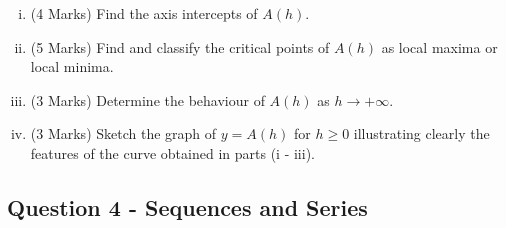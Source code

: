 ﻿ \documentclass[a4paper,12pt]{article}
\begin{document}
	\bigskip
\begin{enumerate}[(i)]
\item (4 Marks) Find the axis intercepts of $A(h)$.
	
	\bigskip
\item (5 Marks) Find and classify the critical points of $A(h)$ as local maxima or
local minima.
	
	\bigskip
\item (3 Marks) Determine the behaviour of $A(h)$ as $h \rightarrow + \infty$.
	
	\bigskip
	\item (3 Marks) Sketch the graph of $y = A(h)$ for $h \geq 0$ illustrating clearly
the features of the curve obtained in parts (i - iii).
	
	

\end{enumerate}


\newpage
\subsection*{Question 4 - Sequences and Series}

\end{document}
